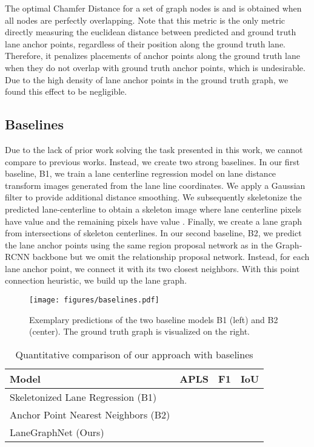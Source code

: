 \documentclass[letterpaper, 10 pt, conference]{ieeeconf}
\begin{document}
The optimal Chamfer Distance for a set of graph nodes is  and is obtained when all nodes are perfectly overlapping. Note that this metric is the only metric directly measuring the euclidean distance between predicted and ground truth lane anchor points, regardless of their position along the ground truth lane. Therefore, it penalizes placements of anchor points along the ground truth lane when they do not overlap with ground truth anchor points, which is undesirable. Due to the high density of lane anchor points in the ground truth graph, we found this effect to be negligible.


\subsection{Baselines}


Due to the lack of prior work solving the task presented in this work, we cannot compare to previous works. Instead, we create two strong baselines. In our first baseline, B1, we train a lane centerline regression model on lane distance transform images generated from the lane line coordinates. We apply a Gaussian filter to provide additional distance smoothing. We subsequently skeletonize the predicted lane-centerline to obtain a skeleton image where lane centerline pixels have value  and the remaining pixels have value . Finally, we create a lane graph from intersections of skeleton centerlines. In our second baseline, B2, we predict the lane anchor points using the same region proposal network as in the Graph-RCNN backbone but we omit the relationship proposal network. Instead, for each lane anchor point, we connect it with its two closest neighbors. With this point connection heuristic, we build up the lane graph.



\begin{figure}
\centering
\texttt{[image: figures/baselines.pdf]}
    \caption{Exemplary predictions of the two baseline models B1 (left) and B2 (center). The ground truth graph is visualized on the right.}
    \label{fig:qualitative-baselines} 
\end{figure}




\begin{table}
\centering
\caption{Quantitative comparison of our approach with baselines}
\label{tab:baselines}
\begin{tabular}{p{4.5cm}p{0.6cm}p{0.6cm}p{0.6cm}}
Model & APLS & F1 & IoU  \\
 \hline
Skeletonized Lane Regression (B1) &  &  &  \\
Anchor Point Nearest Neighbors (B2) &  &  &  \\
 \hline
LaneGraphNet (Ours) &  &  &  \\
\end{tabular}
\end{table}
\end{document}
